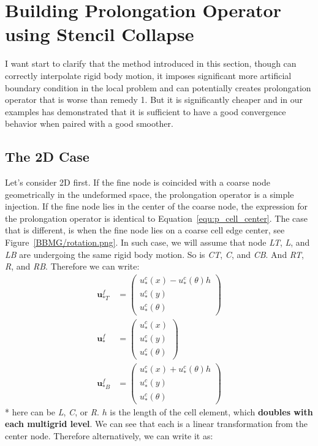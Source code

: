 \section{Building Prolongation Operator using Stencil Collapse}
I want start to clarify that the method introduced in this section, though can correctly interpolate rigid body motion, it imposes significant more artificial boundary condition in the local problem and can potentially creates prolongation operator that is worse than remedy 1. But it is significantly cheaper and in our examples has demonstrated that it is sufficient to have a good convergence behavior when paired with a good smoother. 
\subsection{The 2D Case}
Let's consider 2D first. If the fine node is coincided with a coarse node geometrically in the undeformed space, the prolongation operator is a simple injection. If the fine node lies in the center of the coarse node, the expression for the prolongation operator is identical to Equation~\ref{equ:p_cell_center}. The case that is different, is when the fine node lies on a coarse cell edge center, see Figure~\ref{BBMG/rotation.png}. In such case, we will assume that node \textit{LT}, \textit{L}, and \textit{LB} are undergoing the same rigid body motion. So is \textit{CT}, \textit{C}, and \textit{CB}. And \textit{RT}, \textit{R}, and \textit{RB}. Therefore we can write:
\begin{align*}
 \mathbf{u}^f_{*T} &= \left(\begin{array}{c} u^c_*(x) - u^c_*(\theta)h \\ u^c_*(y) \\ u^c_*(\theta) \end{array}\right) \\
 \mathbf{u}^f_{*} &= \left(\begin{array}{c} u^c_*(x) \\ u^c_*(y) \\ u^c_*(\theta) \end{array}\right) \\
 \mathbf{u}^f_{*B} &= \left(\begin{array}{c} u^c_*(x) + u^c_*(\theta)h \\ u^c_*(y) \\ u^c_*(\theta) \end{array}\right) 
\end{align*}
 * here can be \textit{L},  \textit{C}, or \textit{R}. $h$ is the length of the cell element, which  \textbf{doubles with each multigrid level}. We can see that each is a linear transformation from the center node. Therefore alternatively, we can write it as:
